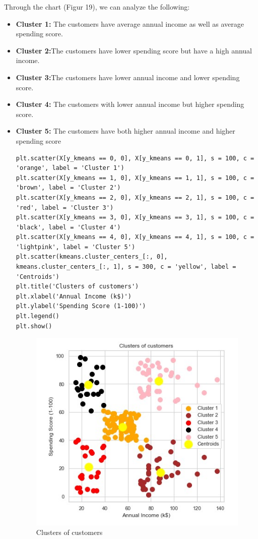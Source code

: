 \documentclass{article}
\begin{document}
Through the chart (Figur 19), we can analyze the following:
\begin{itemize}

\item \textbf{Cluster 1:} The customers have average annual income as well as average spending score.

\item \textbf{Cluster 2:}The customers have lower spending score but have a high annual income.

\item \textbf{Cluster 3:}The customers have lower annual income and lower spending score.
\item \textbf{Cluster 4:} The customers with lower annual income but higher spending score.

\item \textbf{Cluster 5:} The customers have both higher annual income and higher spending score 

\begin{lstlisting}
plt.scatter(X[y_kmeans == 0, 0], X[y_kmeans == 0, 1], s = 100, c = 'orange', label = 'Cluster 1')
plt.scatter(X[y_kmeans == 1, 0], X[y_kmeans == 1, 1], s = 100, c = 'brown', label = 'Cluster 2')
plt.scatter(X[y_kmeans == 2, 0], X[y_kmeans == 2, 1], s = 100, c = 'red', label = 'Cluster 3')
plt.scatter(X[y_kmeans == 3, 0], X[y_kmeans == 3, 1], s = 100, c = 'black', label = 'Cluster 4')
plt.scatter(X[y_kmeans == 4, 0], X[y_kmeans == 4, 1], s = 100, c = 'lightpink', label = 'Cluster 5')
plt.scatter(kmeans.cluster_centers_[:, 0], kmeans.cluster_centers_[:, 1], s = 300, c = 'yellow', label = 'Centroids')
plt.title('Clusters of customers')
plt.xlabel('Annual Income (k$)')
plt.ylabel('Spending Score (1-100)')
plt.legend()
plt.show()
\end{lstlisting}

\begin{figure}[htp]
    \centering
    \includegraphics[width=15cm]{Clusters.jpg}
    \caption{Clusters of customers}
    \label{fig:Clusters of customers}
\end{figure}


\end{itemize}
\end{document}
